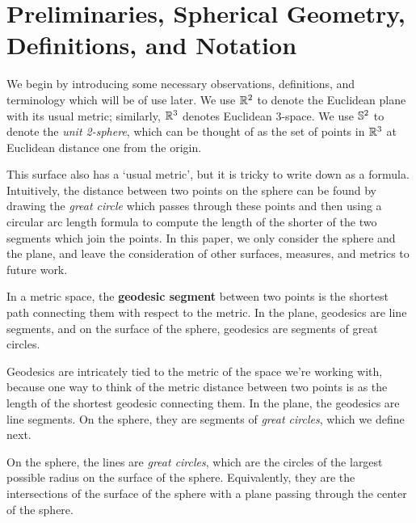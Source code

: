 \section{Preliminaries, Spherical Geometry, Definitions, and Notation}\label{sec:prelims}

We begin by introducing some necessary observations, definitions, and terminology
which will be of use later.  
 We use $\mathbb{R}^2$ to denote the 
Euclidean plane with its usual metric;
similarly, $\mathbb{R}^3$ denotes Euclidean 3-space.  We use $\mathbb{S}^2$ to denote the \textit{unit 2-sphere}, which can be 
thought of as the set of points in $\mathbb{R}^3$ at Euclidean distance one from the origin.  

This surface also has a `usual metric', but it is tricky to write down as a formula.   Intuitively, the distance between two points on the sphere can be found by drawing the \textit{great circle} which passes through these points and then using a circular arc length formula to compute the length of the shorter of the two segments which join the points.  
In this paper, we only consider the sphere and the plane, and leave the consideration of other surfaces, measures, and metrics to future work.










\begin{definition}
	In a metric space, the \textbf{geodesic segment} between two points is the shortest path connecting them with respect to the metric.
	In the plane, geodesics are line segments, and on the surface of the sphere, geodesics are segments of great circles.
\end{definition}





Geodesics are intricately tied to the metric of the space we're working with, because one way to think of the metric distance between two points is as the length of the shortest geodesic connecting them.  In the plane, the geodesics are line segments.  On the sphere, they are segments of \textit{great circles}, which we define next.


\begin{definition}
	On the sphere, the lines are \textit{great circles}, which are the circles of the largest possible radius on the surface of the sphere.  Equivalently, they are the intersections of the surface of the sphere with a plane passing through the center of the sphere.
\end{definition}  


